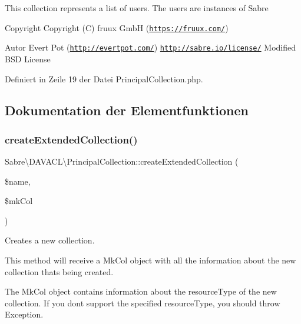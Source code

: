This collection represents a list of users. The users are instances of Sabre

\begin{DoxyCopyright}{Copyright}
Copyright (C) fruux GmbH (\href{https://fruux.com/}{\tt https\+://fruux.\+com/}) 
\end{DoxyCopyright}
\begin{DoxyAuthor}{Autor}
Evert Pot (\href{http://evertpot.com/}{\tt http\+://evertpot.\+com/})  \href{http://sabre.io/license/}{\tt http\+://sabre.\+io/license/} Modified B\+SD License 
\end{DoxyAuthor}


Definiert in Zeile 19 der Datei Principal\+Collection.\+php.



\subsection{Dokumentation der Elementfunktionen}
\mbox{\label{class_sabre_1_1_d_a_v_a_c_l_1_1_principal_collection_ac9836bbc40898bb63ae0bf09fb24a73e}} 
\subsubsection{\texorpdfstring{create\+Extended\+Collection()}{createExtendedCollection()}}
{\footnotesize\ttfamily Sabre\textbackslash{}\+D\+A\+V\+A\+C\+L\textbackslash{}\+Principal\+Collection\+::create\+Extended\+Collection (\begin{DoxyParamCaption}\item[{}]{\$name,  }\item[{\mbox{\hyperlink{class_sabre_1_1_d_a_v_1_1_mk_col}{Mk\+Col}}}]{\$mk\+Col }\end{DoxyParamCaption})}

Creates a new collection.

This method will receive a Mk\+Col object with all the information about the new collection that\textquotesingle{}s being created.

The Mk\+Col object contains information about the resource\+Type of the new collection. If you don\textquotesingle{}t support the specified resource\+Type, you should throw Exception.

